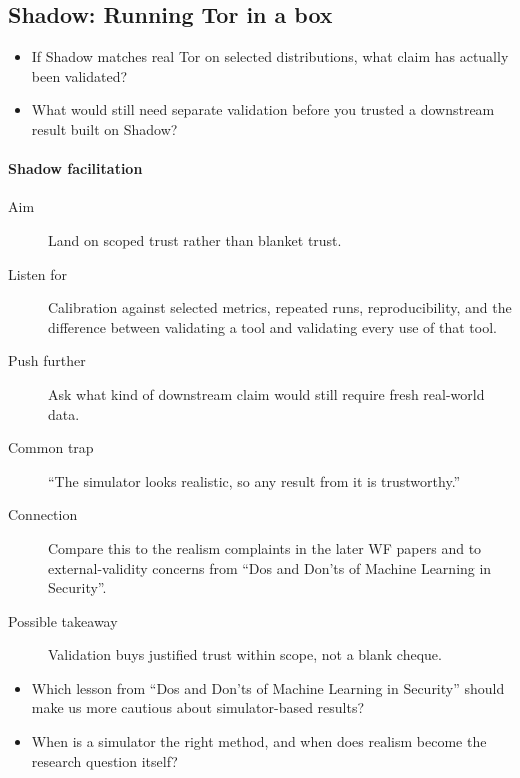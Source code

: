 \subsection{Shadow: Running Tor in a box}

\begin{frame}
  \begin{question}
    \begin{itemize}
      \item If Shadow matches real Tor on selected distributions, what claim
        has actually been validated?
      \item What would still need separate validation before you trusted a
        downstream result built on Shadow?
    \end{itemize}
  \end{question}
\end{frame}

\paragraph{Shadow facilitation}
\begin{description}
  \item[Aim] Land on scoped trust rather than blanket trust.
  \item[Listen for] Calibration against selected metrics, repeated runs,
    reproducibility, and the difference between validating a tool and
    validating every use of that tool.
  \item[Push further] Ask what kind of downstream claim would still require
    fresh real-world data.
  \item[Common trap] \enquote{The simulator looks realistic, so any result
    from it is trustworthy.}
  \item[Connection] Compare this to the realism complaints in the later WF
    papers and to external-validity concerns from \enquote{Dos and Don'ts of
    Machine Learning in Security}.
  \item[Possible takeaway] Validation buys justified trust within scope, not a
    blank cheque.
\end{description}

\begin{frame}
  \begin{question}
    \begin{itemize}
      \item Which lesson from \enquote{Dos and Don'ts of Machine Learning in
        Security} should make us more cautious about simulator-based results?
      \item When is a simulator the right method, and when does realism become
        the research question itself?
    \end{itemize}
  \end{question}
\end{frame}

